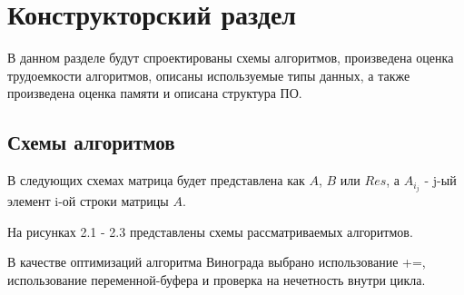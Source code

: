 \chapter{Конструкторский раздел}

В данном разделе будут спроектированы схемы алгоритмов, произведена оценка трудоемкости алгоритмов, описаны используемые типы данных, а также произведена оценка памяти и описана структура ПО.

\section{Схемы алгоритмов}

В следующих схемах матрица будет представлена как $A$, $B$ или $Res$, а $A_{i_j}$ - j-ый элемент i-ой строки матрицы $A$.

На рисунках 2.1 - 2.3 представлены схемы рассматриваемых алгоритмов.

В качестве оптимизаций алгоритма Винограда выбрано использование +=, использование переменной-буфера и проверка на нечетность внутри цикла.
 
